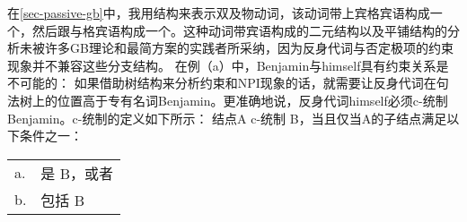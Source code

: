 在\ref{sec-passive-gb}中，我用\xbarc 结构来表示双及物动词，该动词带上宾格宾语构成一个\vbarc，然后跟与格宾语构成一个\vbarc。这种动词带宾语构成\vbarc 的二元结构以及平铺结构的分析未被许多GB理论和最简方案的实践者所采纳，因为反身代词与否定极项的约束现象并不兼容这些分支结构。
在例（a）中，Benjamin与himself具有约束关系是不可能的：
\eal
{}
\zl
如果借助树结构来分析约束和NPI现象的话，就需要让反身代词在句法树上的位置高于专有名词Benjamin。更准确地说，反身代词himself必须c-统制Benjamin。c-统制的定义如下所示\citep[]{Adger2003a}：
\ea
结点A c-统制 B，当且仅当A的子结点满足以下条件之一：\\
\begin{tabular}[t]{@{}l@{~}l@{}}
a. & 是 B，或者\\
b. & 包括 B
\end{tabular}
\z


